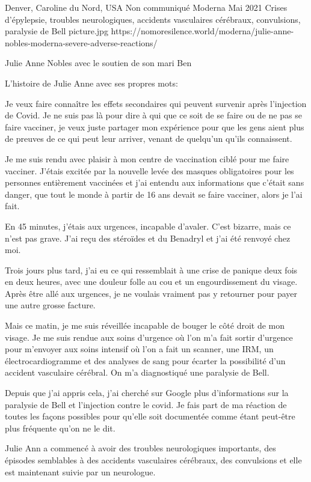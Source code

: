 {Denver, Caroline du Nord, USA}
{Non communiqué}
{Moderna}
{Mai 2021}
{Crises d'épylepsie, troubles neurologiques, accidents vasculaires cérébraux, convulsions, paralysie de Bell}
{picture.jpg}
{https://nomoresilence.world/moderna/julie-anne-nobles-moderna-severe-adverse-reactions/}
{
  
Julie Anne Nobles avec le soutien de son mari Ben

L'histoire de Julie Anne avec ses propres mots:

Je veux faire connaître les effets secondaires qui peuvent survenir après
l'injection de Covid. Je ne suis pas là pour dire à qui que ce soit de se faire
ou de ne pas se faire vacciner, je veux juste partager mon expérience pour que
les gens aient plus de preuves de ce qui peut leur arriver, venant de quelqu'un
qu'ils connaissent.

Je me suis rendu avec plaisir à mon centre de vaccination ciblé pour me faire
vacciner. J'étais excitée par la nouvelle levée des masques obligatoires pour
les personnes entièrement vaccinées et j'ai entendu aux informations que c'était
sans danger, que tout le monde à partir de 16 ans devait se faire vacciner,
alors je l'ai fait.

En 45 minutes, j'étais aux urgences, incapable d'avaler. C'est bizarre, mais ce
n'est pas grave. J'ai reçu des stéroïdes et du Benadryl et j'ai été renvoyé chez
moi.

Trois jours plus tard, j'ai eu ce qui ressemblait à une crise de panique deux
fois en deux heures, avec une douleur folle au cou et un engourdissement du
visage. Après être allé aux urgences, je ne voulais vraiment pas y retourner
pour payer une autre grosse facture.

Mais ce matin, je me suis réveillée incapable de bouger le côté droit de mon
visage. Je me suis rendue aux soins d'urgence où l'on m'a fait sortir d'urgence
pour m'envoyer aux soins intensif où l'on a fait un scanner, une IRM, un
électrocardiogramme et des analyses de sang pour écarter la possibilité d'un
accident vasculaire cérébral. On m'a diagnostiqué une paralysie de Bell.

Depuis que j'ai appris cela, j'ai cherché sur Google plus d'informations sur la
paralysie de Bell et l'injection contre le covid. Je fais part de ma réaction de
toutes les façons possibles pour qu'elle soit documentée comme étant peut-être
plus fréquente qu'on ne le dit.

Julie Ann a commencé à avoir des troubles neurologiques importants, des épisodes
semblables à des accidents vasculaires cérébraux, des convulsions et elle est
maintenant suivie par un neurologue.

}
